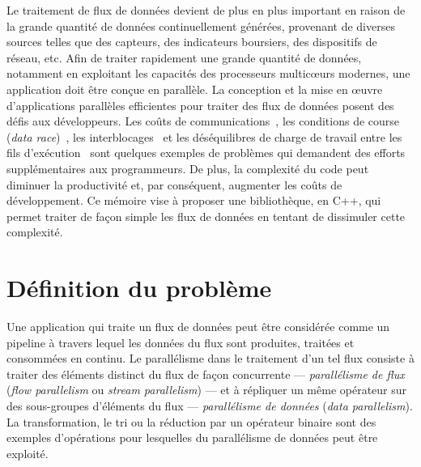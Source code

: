 \begin{introduction}

Le traitement de flux de donn\'ees devient de plus en plus important en raison de la grande quantit\'e de donn\'ees continuellement g\'en\'er\'ees, provenant de diverses sources telles que des capteurs, des indicateurs boursiers, des dispositifs de r\'eseau, etc. Afin de traiter rapidement une grande quantit\'e de donn\'ees, notamment en exploitant les capacit\'es des processeurs multicœurs modernes, une application doit \^etre con\c{c}ue en parall\`ele. La conception et la mise en œuvre d'applications parall\`eles efficientes pour traiter des flux de donn\'ees posent des d\'efis aux d\'eveloppeurs. Les co\^uts de communications~\citep{amarasinghe2011ascr}, les conditions de course (\emph{data race})~\citep{wu2015detecting}, les interblocages~\citep{haque2006concurrent} et les d\'es\'equilibres de charge de travail entre les fils d'ex\'ecution~\citep{amarasinghe2011ascr} sont quelques exemples de probl\`emes qui demandent des efforts suppl\'ementaires aux programmeurs. De plus, la complexit\'e du code peut diminuer la productivit\'e et, par cons\'equent, augmenter les co\^uts de d\'eveloppement. Ce m\'emoire vise \`a proposer une bibliothèque, en C++, qui permet traiter de fa\c{c}on simple les flux de donn\'ees en tentant de dissimuler cette complexit\'e.

\section*{D\'efinition du probl\`eme}

Une application qui traite un flux de données peut \^etre consid\'er\'ee comme un pipeline \`a travers lequel les donn\'ees du flux sont produites, trait\'ees et consomm\'ees en continu. Le parall\'elisme dans le traitement d'un tel flux consiste \`a traiter des \'el\'ements distinct du flux de fa\c{c}on concurrente --- \emph{parall\'elisme de flux} (\emph{flow parallelism} ou \emph{stream parallelism}) --- et \`a r\'epliquer un m\^eme op\'erateur sur des sous-groupes d'\'el\'ements du flux --- \emph{parall\'elisme de donn\'ees} (\emph{data parallelism}). La transformation, le tri ou la r\'eduction par un op\'erateur binaire sont des exemples d'op\'erations pour lesquelles du parall\'elisme de donn\'ees peut \^etre exploit\'e. 



\end{introduction}
